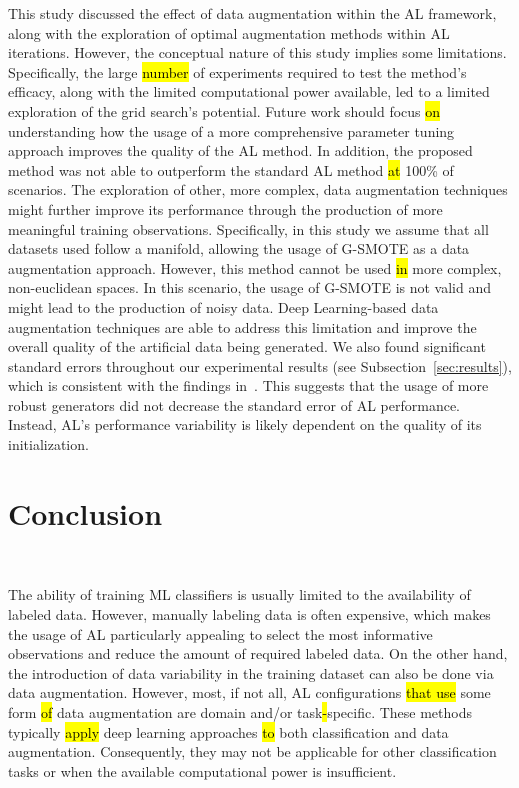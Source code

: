 \documentclass[preprint, 12pt]{elsarticle}
\begin{document}
This study discussed the effect of data augmentation within the AL framework,
along with the exploration of optimal augmentation methods within AL
iterations. However, the conceptual nature of this study implies some
limitations. Specifically, the large \hl{number} of experiments required to
test the method's efficacy, along with the limited computational power
available, led to a limited exploration of the grid search's potential. Future
work should focus \hl{on} understanding how the usage of a more comprehensive
parameter tuning approach improves the quality of the AL method. In addition,
the proposed method was not able to outperform the standard AL method \hl{at}
100\% of scenarios. The exploration of other, more complex, data augmentation
techniques might further improve its performance through the production of
more meaningful training observations. Specifically, in this study we assume
that all datasets used follow a manifold, allowing the usage of G-SMOTE as a
data augmentation approach. However, this method cannot be used \hl{in} more
complex, non-euclidean spaces. In this scenario, the usage of G-SMOTE is not
valid and might lead to the production of noisy data. Deep Learning-based data
augmentation techniques are able to address this limitation and improve the
overall quality of the artificial data being generated. We also found
significant standard errors throughout our experimental results (see
Subsection~\ref{sec:results}), which is consistent with the findings
in~\cite{Fonseca2021, Kottke2017}. This suggests that the usage of more robust
generators did not decrease the standard error of AL performance. Instead,
AL's performance variability is likely dependent on the quality of its
initialization.

\section{Conclusion}~\label{sec:conclusion}

The ability of training ML classifiers is usually limited to the availability
of labeled data. However, manually labeling data is often expensive, which
makes the usage of AL particularly appealing to select the most informative
observations and reduce the amount of required labeled data. On the other
hand, the introduction of data variability in the training dataset can also be
done via data augmentation. However, most, if not all, AL configurations
\hl{that use} some form \hl{of} data augmentation are domain and/or
task\hl{-}specific. These methods typically \hl{apply} deep learning
approaches \hl{to} both classification and data augmentation. Consequently,
they may not be applicable for other classification tasks or when the
available computational power is insufficient.
\end{document}
